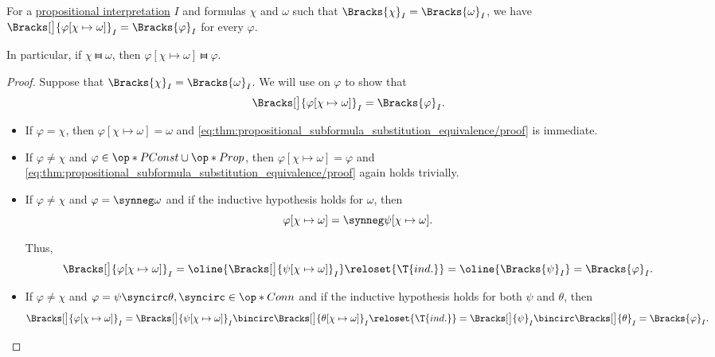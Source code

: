 \begin{proposition}\label{thm:propositional_subformula_substitution_equivalence}
  For a \hyperref[def:propositional_interpretation]{propositional interpretation} \( I \) and formulas \( \chi \) and \( \omega \) such that \( \Bracks{\chi}_I = \Bracks{\omega}_I \), we have \( \Bracks[\big]{\varphi[\chi \mapsto \omega]}_I = \Bracks{\varphi}_I \) for every \( \varphi \).

  In particular, if \( \chi \gleichstark \omega \), then \( \varphi[\chi \mapsto \omega] \gleichstark \varphi \).
\end{proposition}
\begin{proof}
  Suppose that \( \Bracks{\chi}_I = \Bracks{\omega}_I \). We will use  on \( \varphi \) to show that
  \begin{equation}\label{eq:thm:propositional_subformula_substitution_equivalence/proof}
    \Bracks[\big]{\varphi[\chi \mapsto \omega]}_I = \Bracks{\varphi}_I.
  \end{equation}

  \begin{itemize}
    \item If \( \varphi = \chi \), then \( \varphi[\chi \mapsto \omega] = \omega \) and \eqref{eq:thm:propositional_subformula_substitution_equivalence/proof} is immediate.

    \item If \( \varphi \neq \chi \) and \( \varphi \in \op*{PConst} \cup \op*{Prop} \), then \( \varphi[\chi \mapsto \omega] = \varphi \) and \eqref{eq:thm:propositional_subformula_substitution_equivalence/proof} again holds trivially.

    \item If \( \varphi \neq \chi \) and \( \varphi = \synneg \omega \) and if the inductive hypothesis holds for \( \omega \), then
    \begin{equation*}
      \varphi[\chi \mapsto \omega] = \synneg \psi[\chi \mapsto \omega].
    \end{equation*}

    Thus,
    \begin{equation*}
      \Bracks[\big]{ \varphi[\chi \mapsto \omega] }_I
      =
      \oline{\Bracks[\big]{\psi[\chi \mapsto \omega] }_I}
      \reloset {\T{ind.}} =
      \oline{\Bracks{\psi}_I}
      =
      \Bracks{\varphi}_I.
    \end{equation*}

    \item If \( \varphi \neq \chi \) and \( \varphi = \psi \syncirc \theta, {\syncirc} \in \op*{Conn} \) and if the inductive hypothesis holds for both \( \psi \) and \( \theta \), then
    \begin{equation*}
      \Bracks[\big]{ \varphi[\chi \mapsto \omega] }_I
      =
      \Bracks[\big]{ \psi[\chi \mapsto \omega] }_I \bincirc \Bracks[\big]{ \theta[\chi \mapsto \omega] }_I
      \reloset {\T{ind.}} =
      \Bracks[\big]{\psi}_I \bincirc \Bracks[\big]{\theta}_I
      =
      \Bracks{\varphi}_I.
    \end{equation*}
  \end{itemize}


\end{proof}
